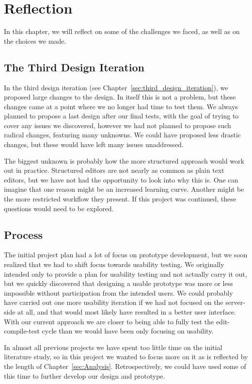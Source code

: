 \chapter{Reflection}
\label{sec:Reflection}
In this chapter, we will reflect on some of the challenges we faced, as well as on the choices we made.

\section{The Third Design Iteration}
In the third design iteration (see Chapter~\ref{sec:third_design_iteration}), we proposed large changes to the design.
In itself this is not a problem, but these changes came at a point where we no longer had time to test them.
We always planned to propose a last design after our final tests, with the goal of trying to cover any issues we discovered, however we had not planned to propose such radical changes, featuring many unknowns.
We could have proposed less drastic changes, but these would have left many issues unaddressed.

The biggest unknown is probably how the more structured approach would work out in practice.
Structured editors are not nearly as common as plain text editors, but we have not had the opportunity to look into why this is. 
One can imagine that one reason might be an increased learning curve. 
Another might be the more restricted workflow they present.
If this project was continued, these questions would need to be explored. 

\section{Process}
The initial project plan had a lot of focus on prototype development, but we
soon realized that we had to shift focus towards usability testing. We
originally intended only to provide a plan for usability testing and not
actually carry it out, but we quickly discovered that designing a usable prototype was more or less impossible without
participation from the intended users. We could probably have carried out one more
usability iteration if we had not focused on the server-side at all, and that
would most likely have resulted in a better user interface. With our
current approach we are closer to being able to fully test the
edit-compile-test cycle than we would have been only focusing on usability.

In almost all previous projects we have spent too little time on the initial literature
study, so in this project we wanted to focus more on it as is reflected by the
length of Chapter~\ref{sec:Analysis}. Retrospectively, we could have used some of this time to further develop our design and prototype. 

